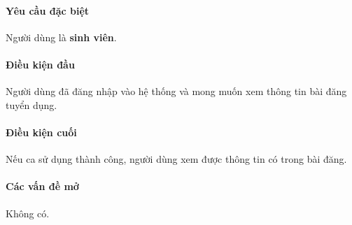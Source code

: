 \documentclass[./../main.tex]{subfiles}
\begin{document}
\paragraph*{Yêu cầu đặc biệt}

Người dùng là \textbf{sinh viên}.

\paragraph*{Điều kiện đầu}

Người dùng đã đăng nhập vào hệ thống và mong muốn xem thông tin bài đăng
tuyển dụng.

\paragraph*{Điều kiện cuối}

Nếu ca sử dụng thành công, người dùng xem được thông tin có trong bài
đăng.

\paragraph*{Các vấn đề mở}

Không có.







\end{document}
